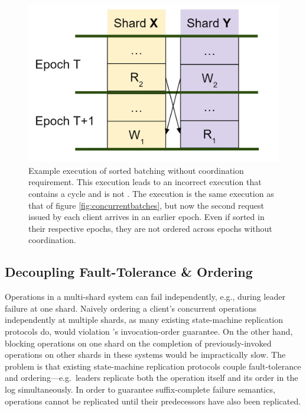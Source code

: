 \begin{figure}[!htb]
\includegraphics[scale=.3]{figs/sorted_batching_wrong.png}
\caption{Example execution of sorted batching without coordination requirement. This execution leads to an incorrect execution that contains a cycle and is not \mdl. The execution is the same execution as that of figure \ref{fig:concurrentbatches}, but now the second request issued by each client arrives in an earlier epoch. Even if sorted in their respective epochs, they are not ordered across epochs without coordination.}
\label{fig:sortedbatchingwrong}
\end{figure}


\subsection{Decoupling Fault-Tolerance \& Ordering}

Operations in a multi-shard system can fail independently, e.g., during leader
failure at one shard. Naively ordering a client's concurrent operations
independently at multiple shards, as many existing state-machine replication
protocols do, would violation \MDL{}'s invocation-order guarantee. On the other
hand, blocking operations on one shard on the completion of previously-invoked
operations on other shards in these systems would be impractically slow. The
problem is that existing state-machine replication protocols couple
fault-tolerance and ordering---e.g.\ leaders replicate both the operation itself
and its order in the log simultaneously. In order to guarantee suffix-complete
failure semantics, operations cannot be replicated until their predecessors have
also been replicated.

